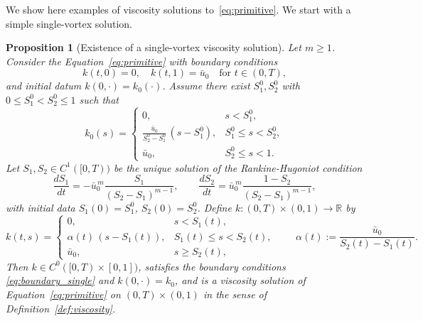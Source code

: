 \documentclass[11pt]{article}
\newtheorem{prop}[thm]{Proposition}
\numberwithin{equation}{section} %
\begin{document}
We show here examples of viscosity solutions to~\eqref{eq:primitive}. We start with a simple single-vortex solution. 
\begin{prop}[Existence of a single-vortex viscosity solution]
Let $m\ge 1$. Consider the Equation~\eqref{eq:primitive}
with boundary conditions
\begin{equation}\label{eq:boundary_single}
  k(t,0)=0,\quad k(t,1)=\bar u_0 \quad\text{for } t\in(0,T),
\end{equation}
and initial datum $k(0,\cdot)=k_0(\cdot)$. Assume there exist $S_1^0,S_2^0$ with $0\le S_1^0<S_2^0\le 1$ such that
$$
k_0(s)=
\begin{cases}
  0, & s<S_1^0,\\
  \displaystyle \frac{\bar u_0}{S_2^0-S_1^0}\,(s-S_1^0), & S_1^0\le s<S_2^0,\\
  \bar u_0, & S_2^0\le s<1.
\end{cases}
$$
Let $S_1,S_2\in C^1 ([0,T) )$ be the unique solution of the Rankine-Hugoniot condition
\begin{equation}\label{eq:RH-single}
  \frac{dS_1}{dt} = -\bar u_0^{\,m}\frac{S_1}{ (S_2-S_1 )^{m-1}},
  \qquad
  \frac{dS_2}{dt} = \bar u_0^{\,m}\frac{1-S_2}{ (S_2-S_1 )^{m-1}},
\end{equation}
with initial data $S_1(0)=S_1^0$, $S_2(0)=S_2^0$. 
Define $k:(0,T)\times(0,1)\to\mathbb{R}$ by
$$
k(t,s)=
\begin{cases}
  0, & s<S_1(t),\\
  \displaystyle \alpha(t)\,(s-S_1(t)), & S_1(t)\le s<S_2(t),\\
  \bar u_0, & s\ge S_2(t),
\end{cases}
\qquad
\alpha(t):=\frac{\bar u_0}{S_2(t)-S_1(t)}.
$$
Then $k\in C^0 ([0,T)\times[0,1] )$, satisfies the boundary conditions \eqref{eq:boundary_single} and $k(0,\cdot)=k_0$, and is a viscosity solution of Equation~\eqref{eq:primitive}    on $(0,T)\times(0,1)$ in the sense of Definition~\ref{def:viscosity}.
\end{prop}
\end{document}
